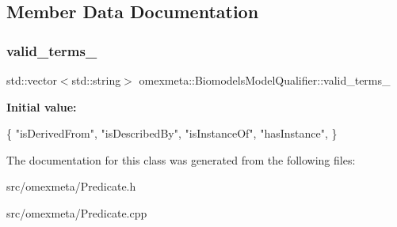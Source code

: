 \subsection{Member Data Documentation}
\mbox{\label{classomexmeta_1_1BiomodelsModelQualifier_ab1d28ff2e7904f06b393a874f3d9607f}} 
\subsubsection{\texorpdfstring{valid\+\_\+terms\+\_\+}{valid\_terms\_}}
{\footnotesize\ttfamily std\+::vector$<$std\+::string$>$ omexmeta\+::\+Biomodels\+Model\+Qualifier\+::valid\+\_\+terms\+\_\+}

{\bfseries Initial value\+:}
\begin{DoxyCode}
\{
                \textcolor{stringliteral}{"isDerivedFrom"},
                \textcolor{stringliteral}{"isDescribedBy"},
                \textcolor{stringliteral}{"isInstanceOf"},
                \textcolor{stringliteral}{"hasInstance"},
        \}
\end{DoxyCode}


The documentation for this class was generated from the following files\+:\begin{DoxyCompactItemize}
\item 
src/omexmeta/Predicate.\+h\item 
src/omexmeta/Predicate.\+cpp\end{DoxyCompactItemize}
